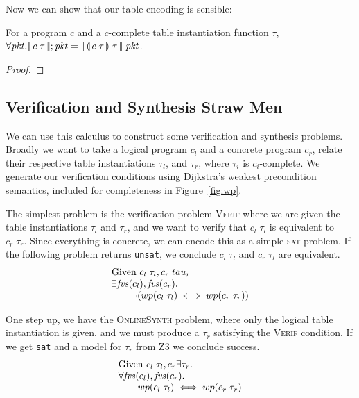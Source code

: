 Now we can show that our table encoding is sensible:

\begin{proposition}
  For a program $c$ and a $c$-complete table instantiation function $\tau$,
  $\forall \mathit{pkt}. \llbracket\,c\; \tau\,\rrbracket;\mathit{pkt} = \llbracket\,\llparenthesis\, c\; \tau\, \rrparenthesis\; \tau\,\rrbracket\; \mathit{pkt}$.
\end{proposition}

\begin{proof}
\end{proof}


\subsection{Verification and Synthesis Straw Men}

We can use this calculus to construct some verification and synthesis
problems. Broadly we want to take a logical program $c_l$ and a concrete program
$c_r$, relate their respective table instantiations $\tau_l$, and $\tau_r$,
where $\tau_i$ is $c_i$-complete.  We generate our verification conditions using
Dijkstra's weakest precondition semantics, included for completeness in
Figure~\ref{fig:wp}.

The simplest problem is the verification problem \textsc{Verif} where we are
given the table instantiations $\tau_l$ and $\tau_r$, and we want to verify that
$c_l\; \tau_l$ is equivalent to $c_r\; \tau_r$. Since everything is concrete, we
can encode this as a simple \textsc{sat} problem. If the following problem
returns \texttt{unsat}, we conclude $c_l\; \tau_l$ and $c_r\; \tau_l$ are
equivalent.
\[\begin{array}{lcl}
    \text{Given } c_l\; \tau_l, c_r\; tau_r \\
    \exists \mathit{fvs}(c_l), \mathit{fvs}(c_r). \\
    \qquad \neg(wp(c_l\; \tau_l) \iff wp(c_r\; \tau_r))
  \end{array}
\]

One step up, we have the \textsc{OnlineSynth} problem, where only the logical
table instantiation is given, and we must produce a $\tau_r$ satisfying the
\textsc{Verif} condition. If we get \texttt{sat} and a model for $\tau_r$ from
Z3 we conclude success.
\[\begin{array}{lcl}
    \text{Given } c_l\; \tau_l,c_r
    \exists \tau_r.\\
    \forall \mathit{fvs}(c_l), \mathit{fvs}(c_r). \\
    \qquad wp(c_l\; \tau_l) \iff wp(c_r\; \tau_r)
  \end{array}
\]

